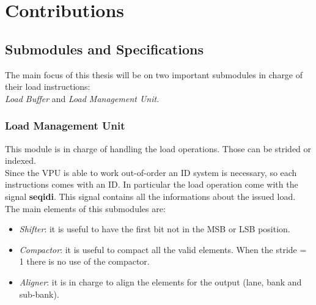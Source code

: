 \chapter{Contributions}
\section{Submodules and Specifications}


The main focus of this thesis will be on two important submodules in charge of their load instructions:\\

\textit{Load Buffer} and \textit{Load Management Unit}.

\subsection{Load Management Unit}


This module is in charge of handling the load operations.
Those can be strided or indexed.\\

Since the VPU is able to work out-of-order an ID system is necessary, so each instructions comes with an ID.
In particular the load operation come with the signal \textbf{seq\+id\+i}.
This signal contains all the informations about the issued load.\\

The main elements of this submodules are:
\begin{itemize}
    \item \textit{Shifter}: it is useful to have the first bit not in the MSB or LSB position.
    
    \item \textit{Compactor}: it is useful to compact all the valid elements. When the stride = 1 there is no use of the compactor.
    
    \item \textit{Aligner}: it is in charge to align the elements for the output (lane, bank and sub-bank).
\end{itemize}

\bigskip

